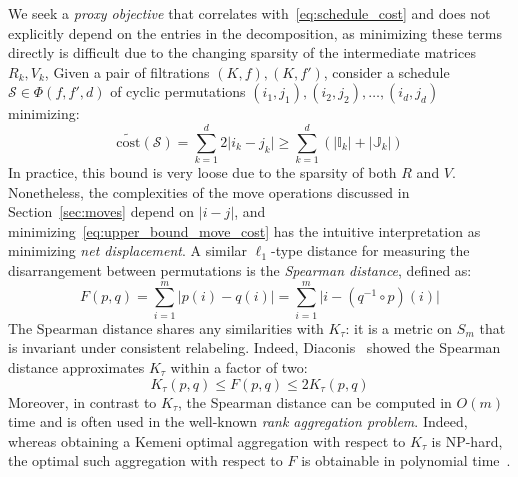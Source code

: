 \documentclass[sn-mathphys]{sn-jnl}
\begin{document}
We seek a \emph{proxy objective} that correlates with~\eqref{eq:schedule_cost} and does not explicitly depend on the entries in the decomposition, as minimizing these terms directly is difficult due to  the changing sparsity of the intermediate matrices $R_k, V_k$,  
Given a pair of filtrations $(K, f), (K,f')$, consider a schedule $\mathcal{S} \in \Phi(f,f',d)$ of cyclic permutations $(i_1, j_1), (i_2, j_2), \dots, (i_d, j_d)$ minimizing:
\begin{equation}\label{eq:upper_bound_move_cost}
\mathrm{\widetilde{cost}}(\mathcal{S}) = \sum\limits_{k=1}^d 2 \lvert i_k - j_k \rvert \geq \sum\limits_{k=1}^d ( \lvert \mathbb{I}_k \rvert + \lvert \mathbb{J}_k\rvert )
\end{equation}
In practice, this bound is very loose due to the sparsity of both $R$ and $V$. Nonetheless, the complexities of the move operations discussed in Section~\ref{sec:moves} depend on $\lvert i - j \rvert$, and minimizing~\eqref{eq:upper_bound_move_cost} has the intuitive interpretation as minimizing \emph{net displacement}. 
A similar $\ell_1$-type distance for measuring the disarrangement between permutations is the \emph{Spearman distance}, defined as:
\begin{equation}\label{eq:spearman_dist}
F(p, q) = \sum\limits_{i =1}^m \lvert p(i) - q(i) \rvert =  \sum\limits_{i =1}^m \lvert i - (q^{-1} \circ p)(i) \rvert
\end{equation}
The Spearman distance shares any similarities with $K_\tau$: it is a metric on $S_m$ that is invariant under consistent relabeling. 
Indeed, Diaconis~\cite{diaconis1977spearman} showed the Spearman distance approximates $K_\tau$ within a factor of two: 
\begin{equation}\label{eq:diaconis_inequality}
K_\tau(p, q) \leq F(p, q) \leq 2 K_\tau(p, q)
\end{equation}
Moreover, in contrast to $K_\tau$, the Spearman distance can be computed in $O(m)$ time and is often used in the well-known \emph{rank aggregation problem}. Indeed, whereas obtaining a Kemeni optimal aggregation with respect to $K_\tau$ is NP-hard, the optimal such aggregation with respect to $F$ is obtainable in polynomial time~\cite{dinu2006efficient}. 
\end{document}
